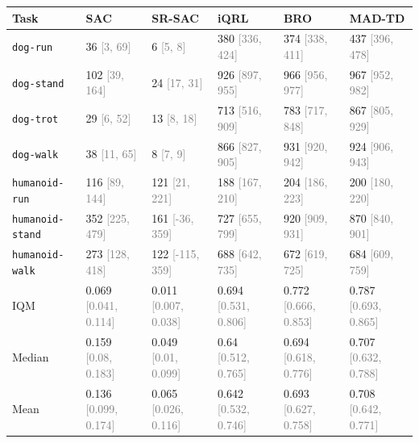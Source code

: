 \begin{tabular}{llllll}
\toprule
\textbf{Task} & \textbf{SAC} & \textbf{SR-SAC} & \textbf{iQRL} & \textbf{BRO} & \textbf{MAD-TD} \\
\midrule
\texttt{dog-run} & 36 \textcolor{gray}{[3, 69]} & 6 \textcolor{gray}{[5, 8]} & 380 \textcolor{gray}{[336, 424]} & 374 \textcolor{gray}{[338, 411]} & 437 \textcolor{gray}{[396, 478]} \\
\texttt{dog-stand} & 102 \textcolor{gray}{[39, 164]} & 24 \textcolor{gray}{[17, 31]} & 926 \textcolor{gray}{[897, 955]} & 966 \textcolor{gray}{[956, 977]} & 967 \textcolor{gray}{[952, 982]} \\
\texttt{dog-trot} & 29 \textcolor{gray}{[6, 52]} & 13 \textcolor{gray}{[8, 18]} & 713 \textcolor{gray}{[516, 909]} & 783 \textcolor{gray}{[717, 848]} & 867 \textcolor{gray}{[805, 929]} \\
\texttt{dog-walk} & 38 \textcolor{gray}{[11, 65]} & 8 \textcolor{gray}{[7, 9]} & 866 \textcolor{gray}{[827, 905]} & 931 \textcolor{gray}{[920, 942]} & 924 \textcolor{gray}{[906, 943]} \\
\texttt{humanoid-run} & 116 \textcolor{gray}{[89, 144]} & 121 \textcolor{gray}{[21, 221]} & 188 \textcolor{gray}{[167, 210]} & 204 \textcolor{gray}{[186, 223]} & 200 \textcolor{gray}{[180, 220]} \\
\texttt{humanoid-stand} & 352 \textcolor{gray}{[225, 479]} & 161 \textcolor{gray}{[-36, 359]} & 727 \textcolor{gray}{[655, 799]} & 920 \textcolor{gray}{[909, 931]} & 870 \textcolor{gray}{[840, 901]} \\
\texttt{humanoid-walk} & 273 \textcolor{gray}{[128, 418]} & 122 \textcolor{gray}{[-115, 359]} & 688 \textcolor{gray}{[642, 735]} & 672 \textcolor{gray}{[619, 725]} & 684 \textcolor{gray}{[609, 759]} \\
IQM & 0.069 \textcolor{gray}{[0.041, 0.114]} & 0.011 \textcolor{gray}{[0.007, 0.038]} & 0.694 \textcolor{gray}{[0.531, 0.806]} & 0.772 \textcolor{gray}{[0.666, 0.853]} & 0.787 \textcolor{gray}{[0.693, 0.865]} \\
Median & 0.159 \textcolor{gray}{[0.08, 0.183]} & 0.049 \textcolor{gray}{[0.01, 0.099]} & 0.64 \textcolor{gray}{[0.512, 0.765]} & 0.694 \textcolor{gray}{[0.618, 0.776]} & 0.707 \textcolor{gray}{[0.632, 0.788]} \\
Mean & 0.136 \textcolor{gray}{[0.099, 0.174]} & 0.065 \textcolor{gray}{[0.026, 0.116]} & 0.642 \textcolor{gray}{[0.532, 0.746]} & 0.693 \textcolor{gray}{[0.627, 0.758]} & 0.708 \textcolor{gray}{[0.642, 0.771]} \\
\bottomrule
\end{tabular}
